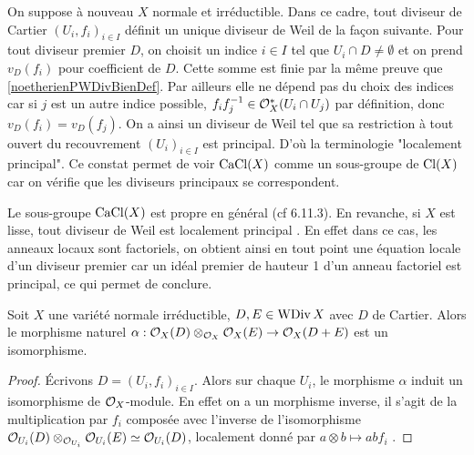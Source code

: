 On suppose à nouveau $X$ normale et irréductible. Dans ce cadre, tout diviseur de Cartier $(U_i, f_i)_{i\in I}$ définit un unique diviseur de Weil de la façon suivante. Pour tout diviseur premier $D$, on choisit un indice $i\in I$ tel que $U_i\cap D\neq \emptyset$ et on prend $v_D(f_i)$ pour coefficient de $D$. Cette somme est finie par la même preuve que \ref{noetherienPWDivBienDef}. Par ailleurs elle ne dépend pas du choix des indices car si $j$ est un autre indice possible, $f_if_j^{-1}\in \mathcal{O}_X^*(U_i\cap U_j)$ par définition, donc $v_D(f_i)=v_D(f_j)$. On a ainsi un diviseur de Weil tel que sa restriction à tout ouvert du recouvrement $(U_i)_{i\in I}$ est principal. D'où la terminologie "localement principal". Ce constat permet de voir $\operatorname{CaCl}(X)$ comme un sous-groupe de $\operatorname{Cl}(X)$ car on vérifie que les diviseurs principaux se correspondent.

Le sous-groupe $\operatorname{CaCl}(X)$ est propre en général (cf \cite{Hartshorne} 6.11.3). En revanche, si $X$ est lisse, tout diviseur de Weil est localement principal . En effet dans ce cas, les anneaux locaux sont factoriels, on obtient ainsi en tout point une équation locale d'un diviseur premier car un idéal premier de hauteur 1 d'un anneau factoriel est principal, ce qui permet de conclure.

\begin{prop}\label{isomophismeOTimes}
Soit $X$ une variété normale irréductible, $D,E\in\operatorname{WDiv} X$ avec $D$ de Cartier. Alors le morphisme naturel $\alpha:\mathcal{O}_X(D)\otimes_{\mathcal{O}_X}\mathcal{O}_X(E)\rightarrow \mathcal{O}_X(D+E)$ est un isomorphisme.
\end{prop}
\begin{proof}
Écrivons $D=(U_i,f_i)_{i\in I}$. Alors sur chaque $U_i$, le morphisme $\alpha$ induit un isomorphisme de $\mathcal{O}_X$-module. En effet on a un morphisme inverse, il s'agit de la multiplication par $f_i$ composée avec l'inverse de l'isomorphisme $\mathcal{O}_{U_i}(D)\otimes_{\mathcal{O}_{U_i}}\mathcal{O}_{U_i}(E) \simeq \mathcal{O}_{U_i}(D)$, localement donné par $a\otimes b\mapsto abf_i$ .
\end{proof}

